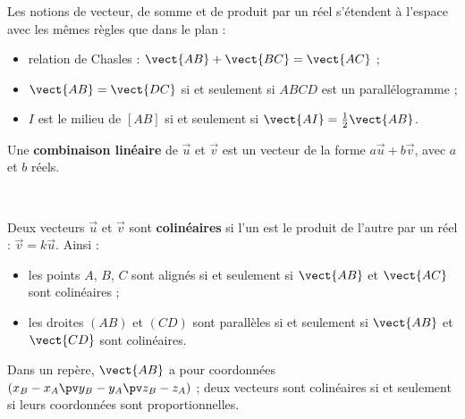 \noindent
\begin{minipage}[c]{0.58\linewidth}
\begin{definition}
\raggedright
Les notions de vecteur, de somme et de produit par un réel s'étendent à l'espace avec les mêmes règles que dans le plan :
\begin{itemize}[leftmargin=1.2em,itemsep=0.3mm,topsep=0.6mm]
  \item relation de Chasles : $\vect{AB}+\vect{BC}=\vect{AC}$ ;
  \item $\vect{AB}=\vect{DC}$ si et seulement si $ABCD$ est un parallélogramme ;
  \item $I$ est le milieu de $[AB]$ si et seulement si $\vect{AI}=\frac12\vect{AB}$.
\end{itemize}
Une \textbf{combinaison linéaire} de $\vec u$ et $\vec v$ est un vecteur de la forme $a\vec u+b\vec v$, avec $a$ et $b$ réels.
\end{definition}
\end{minipage}\hfill
\begin{minipage}[c]{0.38\linewidth}
\centering
{}\\[0.5mm]
\end{minipage}

\begin{propriete}[Colinéarité]
Deux vecteurs $\vec u$ et $\vec v$ sont \textbf{colinéaires} si l'un est le produit de l'autre par un réel : $\vec v=k\vec u$. Ainsi :
\begin{itemize}[leftmargin=1.2em,itemsep=0.3mm,topsep=0.6mm]
  \item les points $A$, $B$, $C$ sont alignés si et seulement si $\vect{AB}$ et $\vect{AC}$ sont colinéaires ;
  \item les droites $(AB)$ et $(CD)$ sont parallèles si et seulement si $\vect{AB}$ et $\vect{CD}$ sont colinéaires.
\end{itemize}
Dans un repère, $\vect{AB}$ a pour coordonnées $(x_B-x_A\pv y_B-y_A\pv z_B-z_A)$ ; deux vecteurs sont colinéaires si et
seulement si leurs coordonnées sont proportionnelles.
\end{propriete}


